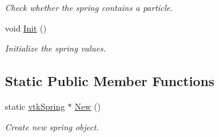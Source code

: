 \begin{DoxyCompactItemize}
\begin{DoxyCompactList}\small\item\em Check whether the spring contains a particle. \item\end{DoxyCompactList}\item 
\hypertarget{classvtkSpring_a5a052f14247571a9f8b1da89f3c3caba}{
void \hyperlink{classvtkSpring_a5a052f14247571a9f8b1da89f3c3caba}{Init} ()}
\label{classvtkSpring_a5a052f14247571a9f8b1da89f3c3caba}

\begin{DoxyCompactList}\small\item\em Initialize the spring values. \item\end{DoxyCompactList}\end{DoxyCompactItemize}
\subsection*{Static Public Member Functions}
\begin{DoxyCompactItemize}
\item 
\hypertarget{classvtkSpring_a74c07216f5f65129afac616eea49737e}{
static \hyperlink{classvtkSpring}{vtkSpring} $\ast$ \hyperlink{classvtkSpring_a74c07216f5f65129afac616eea49737e}{New} ()}
\label{classvtkSpring_a74c07216f5f65129afac616eea49737e}

\begin{DoxyCompactList}\small\item\em Create new spring object. \item\end{DoxyCompactList}\end{DoxyCompactItemize}
